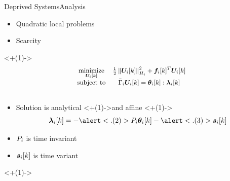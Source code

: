 \documentclass[aspectratio=169]{beamer}
\begin{document}
\begin{frame}{Deprived Systems}{Analysis}
  \begin{minipage}[t]{.45\textwidth}
    \begin{assumptions}
      \begin{itemize}[<+(1)->]
        \item Quadratic local problems
        \item Scarcity
      \end{itemize}
    \end{assumptions}
  \end{minipage}
  \hfill
  \begin{minipage}[t]{0.45\textwidth}
    \centering
    \onslide<+(1)->{
      \begin{equation*}
        \small
        \begin{matrix}
          {\minimize\limits_{\vec{U}_{i}[k]}}&{\frac{1}{2}\norm{\vec{U}_{i}[k]}^{2}_{H_{i}} + {\vec{f}_{i}[k]}^{T}\vec{U}_{i}[k]}\\
          \mathrm{subject~ to} & \bar{\Gamma}_{i}\vec{U}_{i}[k] = \thetaik:\lambdaik \\
                                             &\\
        \end{matrix}
      \end{equation*}
    }
  \end{minipage}

  \begin{itemize}[<+(1)->]
    \item Solution is analytical \onslide<+(1)->{and affine}
          \onslide<+(1)->{
          \begin{equation*}
            \lambdaik=-\alert<.(2)>{\Plin}\thetaik-\alert<.(3)>{\sik}
          \end{equation*}
          }
  \end{itemize}

  \vspace{-.5cm}
  \hfill
  \begin{minipage}[t]{.45\linewidth}
    \begin{itemize}[<+(1)->]
      \item ${P}_{i}$ is time invariant 
      \item $\boldsymbol{s}_{i}[k]$ is time variant
    \end{itemize}
  \end{minipage}
  \onslide<+(1)->{
  }
\end{frame}
\end{document}
